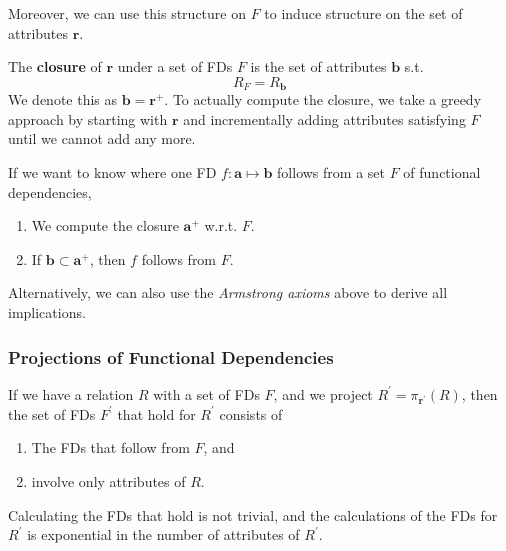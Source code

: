     Moreover, we can use this structure on $F$ to induce structure on the set of attributes $\mathbf{r}$. 

    \begin{definition}
      The \textbf{closure} of $\mathbf{r}$ under a set of FDs $F$ is the set of attributes $\mathbf{b}$ s.t. 
      \begin{equation}
        R_F = R_\mathbf{b}
      \end{equation}
      We denote this as $\mathbf{b} = \mathbf{r}^+$. To actually compute the closure, we take a greedy approach by starting with $\mathbf{r}$ and incrementally adding attributes satisfying $F$ until we cannot add any more. 
    \end{definition}

    \begin{theorem}
      If we want to know where one FD $f: \mathbf{a} \mapsto \mathbf{b}$ follows from a set $F$ of functional dependencies, 
      \begin{enumerate}
        \item We compute the closure $\mathbf{a}^+$ w.r.t. $F$. 
        \item If $\mathbf{b} \subset \mathbf{a}^+$, then $f$ follows from $F$. 
      \end{enumerate}
      Alternatively, we can also use the \textit{Armstrong axioms} above to derive all implications. 
    \end{theorem}
  
  \subsubsection{Projections of Functional Dependencies} 

    If we have a relation $R$ with a set of FDs $F$, and we project $R^\prime = \pi_{\mathbf{r}^\prime} (R)$, then the set of FDs $F^\prime$ that hold for $R^\prime$ consists of 
    \begin{enumerate}
      \item The FDs that follow from $F$, and 
      \item involve only attributes of $R$. 
    \end{enumerate} 

    Calculating the FDs that hold is not trivial, and the calculations of the FDs for $R^\prime$ is exponential in the number of attributes of $R^\prime$. 

